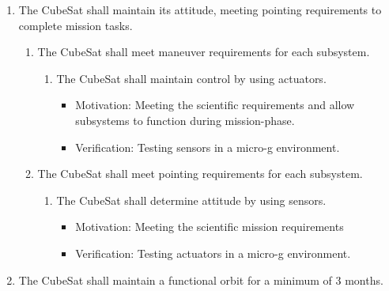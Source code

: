 \documentclass{ece}
\begin{document}
\begin{enumerate}
\begin{enumerate}
\begin{enumerate}
\begin{enumerate}
\begin{itemize}
                                \item Verification:Test rig should be constructed to mimic the pusher plate and spring ejection system, with full functional verification of CubeSat performed afterwards along with manual inspection to ensure all parts remain in place 
                            \end{itemize}
                \end{enumerate}
        \end{enumerate}
    \end{enumerate} %
    \item The CubeSat shall maintain its attitude, meeting pointing requirements to complete mission tasks.
    \begin{enumerate}
        \item The CubeSat shall meet maneuver requirements for each subsystem.
        \begin{enumerate}
            \item The CubeSat shall maintain control by using actuators. 
                \begin{itemize}
                    \item Motivation: Meeting the scientific requirements and allow subsystems to function during mission-phase.
                    \item Verification: Testing sensors in a micro-g environment.
                \end{itemize}
        \end{enumerate}
        \item The CubeSat shall meet pointing requirements for each subsystem.
        \begin{enumerate}
            \item The CubeSat shall determine attitude by using sensors.
                \begin{itemize}
                    \item Motivation: Meeting the scientific mission requirements
                    \item Verification: Testing actuators in a micro-g environment.
                \end{itemize}
        \end{enumerate}
    \end{enumerate} %
    \item The CubeSat shall maintain a functional orbit for a minimum of 3 months.
    \begin{enumerate}

\end{enumerate}
\end{enumerate}
\end{document}
